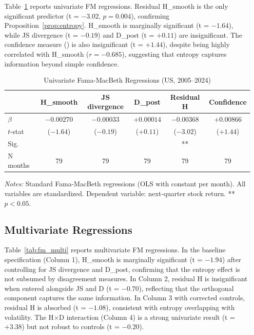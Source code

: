 \documentclass[12pt,a4paper]{article}
\begin{document}
Table~\ref{tab:fm_univariate} reports univariate FM regressions. Residual H\_smooth is the only significant predictor (t = $-3.02$, $p = 0.004$), confirming Proposition~\ref{prop:entropy}. H\_smooth is marginally significant (t = $-1.64$), while JS divergence (t = $-0.19$) and D\_post (t = $+0.11$) are insignificant. The confidence measure (\citealt{Chen2025inner}) is also insignificant (t = $+1.44$), despite being highly correlated with H\_smooth ($r = -0.685$), suggesting that entropy captures information beyond simple confidence.

\begin{table}[H]
\centering
\caption{Univariate Fama-MacBeth Regressions (US, 2005--2024)}
\label{tab:fm_univariate}
\small
\begin{tabular}{lccccc}
\toprule
 & H\_smooth & JS divergence & D\_post & Residual H & Confidence \\
\midrule
$\beta$ & $-0.00270$ & $-0.00033$ & $+0.00014$ & $-0.00368$ & $+0.00866$ \\
$t$-stat & ($-1.64$) & ($-0.19$) & ($+0.11$) & ($-3.02$) & ($+1.44$) \\
Sig. & & & & ** & \\
N months & 79 & 79 & 79 & 79 & 79 \\
\bottomrule
\end{tabular}
\end{table}
\noindent\textit{Notes:} Standard Fama-MacBeth regressions (OLS with constant per month). All variables are standardized. Dependent variable: next-quarter stock return. ** $p<0.05$.

\subsection{Multivariate Regressions}

Table~\ref{tab:fm_multi} reports multivariate FM regressions. In the baseline specification (Column 1), H\_smooth is marginally significant (t = $-1.94$) after controlling for JS divergence and D\_post, confirming that the entropy effect is not subsumed by disagreement measures. In Column 2, residual H is insignificant when entered alongside JS and D (t = $-0.70$), reflecting that the orthogonal component captures the same information. In Column 3 with corrected controls, residual H is absorbed (t = $-1.08$), consistent with entropy overlapping with volatility. The H$\times$D interaction (Column 4) is a strong univariate result (t = $+3.38$) but not robust to controls (t = $-0.20$).
\end{document}
